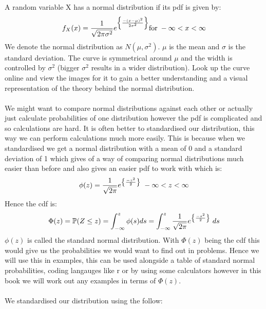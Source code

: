 \documentclass[,oneside]{article}
\begin{document}
\begin{enumerate}
A random variable X has a normal distribution if its pdf is given by:
\begin{align*}
f_X(x)=\frac{1}{\sqrt{2\pi \sigma^2}}e^{\left \{\frac{-(x-\mu)^2}{2\sigma^2}\right \} }  \text{for} \hspace{0.1cm} -\infty < x < \infty \\
\end{align*}
We denote the normal distribution as $N(\mu, \sigma^2)$. $\mu$ is the mean and $\sigma$ is the standard deviation. The curve is symmetrical around $\mu$ and the width is controlled by $\sigma^2$ (bigger $\sigma^2$ results in a wider distribution). Look up the curve online and view the images for it to gain a better understanding and a visual representation of the theory behind the normal distribution. \\ \\
We might want to compare normal distributions against each other or actually just calculate probabilities of one distribution however the pdf is complicated and so calculations are hard. It is often better to standardised our distribution, this way we can perform calculations much more easily. This is because when we standardised we get a normal distribution with a mean of 0 and a standard deviation of 1 which gives of a way of comparing normal distributions much easier than before and also gives an easier pdf to work with which is:
\begin{align*}
\phi(z) = \frac{1}{\sqrt{2\pi}}e^{\left \{ \frac{-z^2}{2} \right \}}  \hspace{0.1cm} -\infty < z < \infty \\
\end{align*}
Hence the cdf is:
\begin{align*}
\Phi(z) =\mathbb{P}(Z \leq z) = \int_{-\infty}^{z}\phi(s)ds=\int_{-\infty}^{z}\frac{1}{\sqrt{2\pi}}e^{\left \{ \frac{-s^2}{2} \right \}} \hspace{0.1cm}ds
\end{align*}
$\phi(z)$ is called the standard normal distribution. With $\Phi(z)$ being the cdf this would give us the probabilities we would want to find out in problems. Hence we will use this in examples, this can be used alongside a table of standard normal probabilities, coding langauges like r or by using some calculators however in this book we will work out any examples in terms of $\Phi(z)$.\\ \\
We standardised our distribution using the follow:\\ \\

\end{enumerate}
\end{document}
